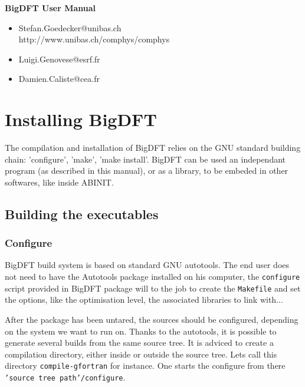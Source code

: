 \documentclass[a4paper,11pt]{report}
\begin{document}

\begin{center} \huge
{\bf \color{red} BigDFT User Manual}
\end{center}

\large
\begin{itemize}
\item Stefan.Goedecker@unibas.ch \\
http://www.unibas.ch/comphys/comphys \\
\item Luigi.Genovese@esrf.fr \\
\item Damien.Caliste@cea.fr
\end{itemize}
\normalsize
\tableofcontents

\chapter{Installing BigDFT}

The compilation and installation of BigDFT relies on the GNU standard building chain: 'configure', 'make', 'make install'. BigDFT can be used an independant program (as described in this manual), or as a library, to be embeded in other softwares, like inside ABINIT.

\section{Building the executables}

\subsection{Configure}
BigDFT build system is based on standard GNU autotools. The end
user does not need to have the Autotools package installed on his
computer, the \texttt{configure} script provided in BigDFT package
will to the job to create the \texttt{Makefile} and set the
options, like the optimisation level, the associated libraries to link
with...

After the package has been untared, the sources should be configured, depending on the system we want to run on. Thanks to the autotools, it is possible to generate several builds from the same source tree. It is adviced to create a compilation directory, either inside or outside the source tree. Lets call this directory \texttt{compile-gfortran} for instance. One starts the configure from there \texttt{'source tree path'/configure}.
\end{document}

